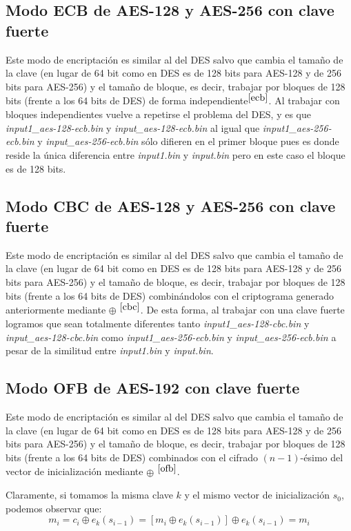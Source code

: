 \documentclass[a4paper, 11pt]{article}
\begin{document}
	\subsection{Modo ECB de AES-128 y AES-256 con clave fuerte}\label{AES-ECB}
		Este modo de encriptación es similar al del DES salvo que cambia el tamaño de la clave (en lugar de 64 bit como en
		DES es de 128 bits para AES-128 y de 256 bits para AES-256) y el tamaño de bloque, es decir, trabajar por bloques
		de 128 bits (frente a los 64 bits de DES) de forma independiente$^{\ref{ecb}}$. Al trabajar con bloques independientes
		vuelve a repetirse el problema del DES, y es que \textit{input1\_aes-128-ecb.bin} y \textit{input\_aes-128-ecb.bin}
		al igual que \textit{input1\_aes-256-ecb.bin} y \textit{input\_aes-256-ecb.bin} sólo difieren en el primer bloque
		pues es donde reside la única diferencia entre \textit{input1.bin} y \textit{input.bin} pero en este caso el bloque
		es de 128 bits.
		
	\subsection{Modo CBC de AES-128 y AES-256 con clave fuerte}\label{AES-CBC}
		Este modo de encriptación es similar al del DES salvo que cambia el tamaño de la clave (en lugar de 64 bit como en
		DES es de 128 bits para AES-128 y de 256 bits para AES-256) y el tamaño de bloque, es decir, trabajar por bloques
		de 128 bits (frente a los 64 bits de DES) combinándolos con el criptograma generado anteriormente mediante $\oplus$
		$^{\ref{cbc}}$. De esta forma, al trabajar con una clave fuerte logramos que sean totalmente diferentes tanto
		\textit{input1\_aes-128-cbc.bin} y \textit{input\_aes-128-cbc.bin} como \textit{input1\_aes-256-ecb.bin} y
		\textit{input\_aes-256-ecb.bin} a pesar de la similitud entre \textit{input1.bin} y \textit{input.bin}.
		
	\subsection{Modo OFB de AES-192 con clave fuerte}
		Este modo de encriptación es similar al del DES salvo que cambia el tamaño de la clave (en lugar de 64 bit como en
		DES es de 128 bits para AES-128 y de 256 bits para AES-256) y el tamaño de bloque, es decir, trabajar por bloques
		de 128 bits (frente a los 64 bits de DES) combinados con el cifrado $(n-1)$-ésimo del vector de inicialización
		mediante $\oplus$ $^{\ref{ofb}}$.
		
		Claramente, si tomamos la misma clave $k$ y el mismo vector de inicialización $s_0$, podemos observar que:
		\[m_i = c_i \oplus e_k(s_{i-1}) = [m_i \oplus e_k(s_{i-1})] \oplus e_k(s_{i-1}) = m_i\]
		
\end{document}
